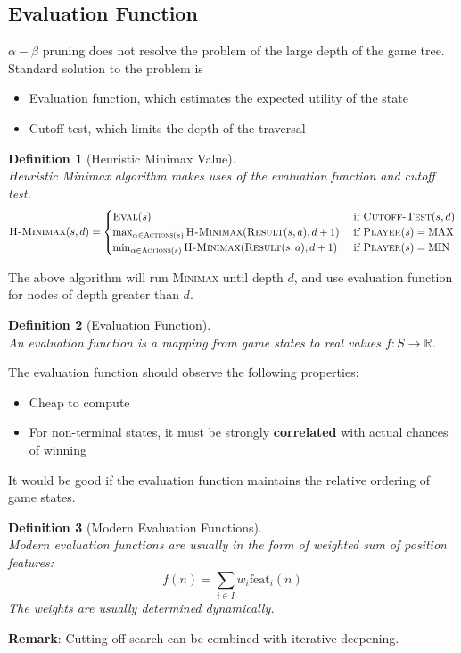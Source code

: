 \documentclass[12pt]{article}
\newtheorem{definition}{Definition}[section]
\theoremstyle{definition}
\begin{document}
\subsection{Evaluation Function}
$\alpha-\beta$ pruning does not resolve the problem of the large depth of the game tree.\\
Standard solution to the problem is
\begin{itemize}
	\item Evaluation function, which estimates the expected utility of the state
	\item Cutoff test, which limits the depth of the traversal
\end{itemize}
\begin{definition}[Heuristic Minimax Value]
\hfill\\\normalfont Heuristic Minimax algorithm makes uses of the evaluation function and cutoff test.
\[
\textsc{H-Minimax}(s,d)=\begin{cases}
\textsc{Eval}(s)&\text{ if }\textsc{Cutoff-Test}(s,d)\\
\max_{\alpha\in\textsc{Actions}(s)}\textsc{H-Minimax}(\textsc{Result}(s,a),d+1)&\text{ if }\textsc{Player}(s)=\text{MAX}\\
\min_{\alpha\in\textsc{Actions}(s)}\textsc{H-Minimax}(\textsc{Result}(s,a),d+1)&\text{ if }\textsc{Player}(s)=\text{MIN}
\end{cases}
\]
\end{definition}
The above algorithm will run \textsc{Minimax} until depth $d$, and use evaluation function for nodes of depth greater than $d$.
\begin{definition}[Evaluation Function]
\hfill\\\normalfont An evaluation function is a mapping from game states to real values $f:S\to \mathbb{R}$.
\end{definition}
The evaluation function should observe the following properties:
\begin{itemize}
\item Cheap to compute
\item For non-terminal states, it must be strongly \textbf{correlated} with actual chances of winning
\end{itemize}
It would be good if the evaluation function maintains the relative ordering of game states.
\begin{definition}[Modern Evaluation Functions]
\hfill\\\normalfont Modern evaluation functions are usually in the form of weighted sum of position features:
\[
f(n) = \sum_{i\in I}w_i\text{feat}_i(n)
\] 
The weights are usually determined dynamically.
\end{definition}
\textbf{Remark}: Cutting off search can be combined with iterative deepening.
\end{document}
